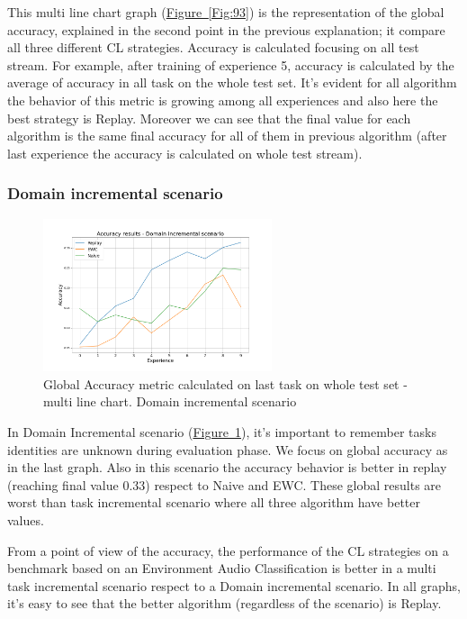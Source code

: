 \documentclass[english, LaM, oneside]{sapthesis}%
\begin{document}
This multi line chart graph (\hyperref[Fig:93]{Figure~\ref*{Fig:93}}) is the representation of the global accuracy, explained in the second point in the previous explanation; it compare all three different CL strategies. Accuracy is calculated focusing on all test stream. For example, after training of experience 5, accuracy is calculated by the average of accuracy in all task on the whole test set. It's evident for all algorithm the behavior of this metric is growing among all experiences and also here the best strategy is Replay. Moreover we can see that the final value for each algorithm is the same final accuracy for all of them in previous algorithm (after last experience the accuracy is calculated on whole test stream).
\subsubsection{Domain incremental scenario}

\begin{figure}[!h]
  
     \centering
     \includegraphics[width=0.60\textwidth]{overview_accuracy_ni.png}
     \caption{Global Accuracy metric calculated on last task on whole test set - multi line chart. Domain incremental scenario}\label{Fig:94}
   
   
\end{figure}
In Domain Incremental scenario (\hyperref[Fig:94]{Figure~\ref*{Fig:94}}), it's important to remember tasks identities are unknown during evaluation phase. We focus on global accuracy as in the last graph.
Also in this scenario the accuracy behavior is better in replay (reaching final value 0.33) respect to Naive and EWC. These global results are worst than task incremental scenario where all three algorithm have better values. 

From a point of view of the accuracy, the performance of the CL strategies on a benchmark based on an Environment Audio Classification is better in a multi task incremental scenario respect to a Domain incremental scenario. In all graphs, it's easy to see that the better algorithm (regardless of the scenario) is Replay.
\end{document}
